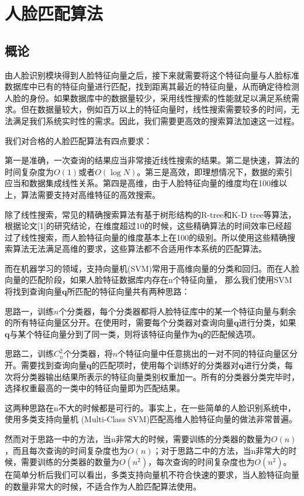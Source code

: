 \chapter{人脸匹配算法}

\section{概论}

由人脸识别模块得到人脸特征向量之后，接下来就需要将这个特征向量与人脸标准数据库中已有的特征向量进行匹配，找到距离其最近的特征向量，从而确定待检测人脸的身份。如果数据库中的数据量较少，采用线性搜索的性能就足以满足系统需求。但在数据量较大，例如百万以上的特征向量时，线性搜索需要较多的时间，无法满足我们系统实时性的需求。因此，我们需要更高效的搜索算法加速这一过程。

我们对合格的人脸匹配算法有四点要求：

第一是准确，一次查询的结果应当非常接近线性搜索的结果。第二是快速，算法的时间复杂度为$O(1)$或者$O(\log{}N)$。第三是高效，即理想情况下，数据的索引应当和数据集成线性关系。第四是高维，由于人脸特征向量的维度均在100维以上，算法需要支持对高维特征的高效搜索。

除了线性搜索，常见的精确搜索算法有基于树形结构的R-tree和K-D tree等算法，根据论文[1]的研究结论，在维度超过10的时候，这些精确算法的时间效率已经超过了线性搜索，而人脸特征向量的维度基本上在100的级别。所以使用这些精确搜索算法无法满足高维的要求，这些算法都不合适用作本系统的匹配算法。

而在机器学习的领域，支持向量机(SVM)常用于高维向量的分类和回归。而在人脸向量的匹配阶段，如果人脸特征数据库内存在n个特征向量， 那么我们使用SVM将找到查询向量$\mathbf{q}$所匹配的特征向量共有两种思路：

思路一，训练$n$个分类器，每个分类器都将人脸特征库中的某一个特征向量与剩余的所有特征向量区分开。在使用时，需要每个分类器对查询向量$\mathbf{q}$进行分类，如果$\mathbf{q}$与某个特征向量分到了同一类，则将该特征向量作为$\mathbf{q}$的匹配候选项。

思路二，训练$C_n^2$个分类器，将$n$个特征向量中任意挑出的一对不同的特征向量区分开。需要找到查询向量$\mathbf{q}$的匹配项时，使用每个训练好的分类器对$\mathbf{q}$进行分类，每次将分类器输出结果所表示的特征向量类别权重加一。所有的分类器分类完毕时，选择权重最高的一类中的特征向量即为匹配结果。

这两种思路在n不大的时候都是可行的。事实上，在一些简单的人脸识别系统中，使用多类支持向量机 (Multi-Class SVM)匹配高维人脸特征向量的做法非常普遍。

然而对于思路一中的方法，当n非常大的时候，需要训练的分类器的数量为$O(n)$，而且每次查询的时间复杂度也为$O(n)$；对于思路二中的方法，当n非常大的时候，需要训练的分类器的数量为$O(n^2)$，每次查询的时间复杂度也为$O(n^2)$。在简单分析后我们可以看出，多类支持向量机不符合快速的要求，当人脸特征向量的数量非常大的时候，不适合作为人脸匹配算法使用。

